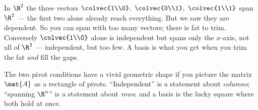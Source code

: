 \begin{example}
\label{ch14:ex-span-not-indep}
In $\R^2$ the three vectors $\colvec{1\\0},\ \colvec{0\\1},\ \colvec{1\\1}$ span
$\R^2$ --- the first two alone already reach everything. But we saw they are
dependent. So you can span with too many vectors; there is fat to trim.
Conversely $\colvec{1\\0}$ alone is independent but spans only the $x$-axis, not
all of $\R^2$ --- independent, but too few. A basis is what you get when you trim
the fat \emph{and} fill the gaps.
\end{example}

The two pivot conditions have a vivid geometric shape if you picture the matrix
$\mat{A}$ as a rectangle of pivots. ``Independent'' is a statement about
\emph{columns}; ``spanning $\R^n$'' is a statement about \emph{rows}; and a basis
is the lucky square where both hold at once.

